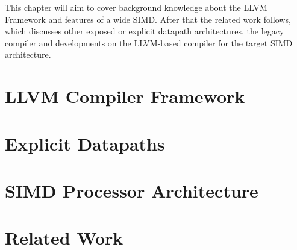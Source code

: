 This chapter will aim to cover background knowledge about the LLVM Framework and features of a wide SIMD. After that the related work follows, which discusses other exposed or explicit datapath architectures, the legacy compiler and developments on the LLVM-based compiler for the target SIMD architecture.

\section{LLVM Compiler Framework}\label{sec:llvm}


\newpage
\section{Explicit Datapaths}\label{sec:datapaths}


\newpage
\section{SIMD Processor Architecture}\label{sec:simd}


\section{Related Work}\label{sec:related_work}

